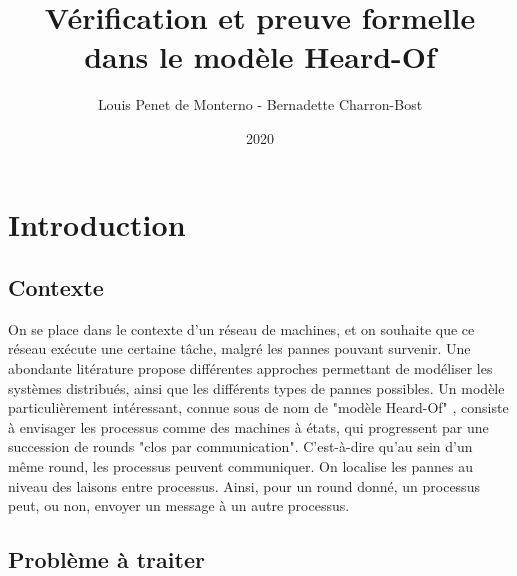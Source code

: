 \documentclass{article}
\title{Vérification et preuve formelle dans le modèle Heard-Of}
\date{2020}
\author{Louis Penet de Monterno - Bernadette Charron-Bost}
\begin{document}
\maketitle

\section{Introduction}

\subsection{Contexte}

On se place dans le contexte d'un réseau de machines, et on souhaite que ce réseau exécute une certaine tâche, malgré les pannes pouvant survenir.
Une abondante litérature propose différentes approches permettant de modéliser les systèmes distribués, ainsi que les différents types de pannes possibles.
Un modèle particulièrement intéressant, connue sous de nom de "modèle Heard-Of" \cite{model_ho},
consiste à envisager les processus comme des machines à états, qui progressent par une succession de rounds "clos par communication".
C'est-à-dire qu'au sein d'un même round, les processus peuvent communiquer.
On localise les pannes au niveau des laisons entre processus. Ainsi, pour un round donné, un processus peut, ou non, envoyer un message à un autre processus.

\subsection{Problème à traiter}
\end{document}
